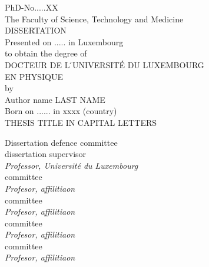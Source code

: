 \documentclass[11pt,a4paper]{report}
\begin{document}
\begin {center}
\footnotesize{PhD-No.....XX}\\
\footnotesize{The Faculty of Science, Technology and Medicine}\\
\vspace{1.0cm}
\Large{DISSERTATION}\\
\vspace{1.0cm}
\normalsize{Presented on ..... in Luxembourg}\\
\vspace{0.25cm}
\normalsize{to obtain the degree of}\\
\vspace{1.0cm}
\Large{DOCTEUR DE L ́UNIVERSITÉ DU LUXEMBOURG}\\
\vspace{0.5cm}
\Large{EN PHYSIQUE}\\
\vspace{0.5cm}
by\\
\vspace{0.5cm}
\Large{Author name LAST NAME}\\
\vspace{0.25cm}
\normalsize{Born on ...... in xxxx (country)}\\
\vspace{1.5cm}
\Large{THESIS TITLE IN CAPITAL LETTERS}

\raggedright
\vspace{1.5cm}
\Large{Dissertation defence committee}\\
\vspace{0.25cm}
\normalsize{ dissertation supervisor}\\
\textit{Professor, Université du Luxembourg}\\
\vspace{0.25cm}
\normalsize{ committee}\\
\textit{Profesor, affilitiaon}\\
\vspace{0.25cm}
\normalsize{ committee}\\
\textit{Profesor, affilitiaon}\\
\vspace{0.25cm}
\normalsize{ committee}\\
\textit{Profesor, affilitiaon}\\
\vspace{0.25cm}
\normalsize{ committee}\\
\textit{Profesor, affilitiaon}\\
\vspace{0.25cm}


\end{center}
\end{document}
